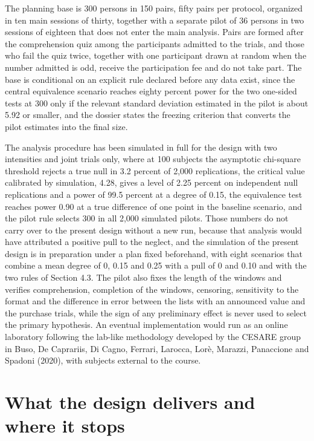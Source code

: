 \documentclass[11pt,a4paper]{article}
\begin{document}
The planning base is 300 persons in 150 pairs, fifty pairs per protocol, organized in ten main sessions of thirty, together with a separate pilot of 36 persons in two sessions of eighteen that does not enter the main analysis. Pairs are formed after the comprehension quiz among the participants admitted to the trials, and those who fail the quiz twice, together with one participant drawn at random when the number admitted is odd, receive the participation fee and do not take part. The base is conditional on an explicit rule declared before any data exist, since the central equivalence scenario reaches eighty percent power for the two one-sided tests at 300 only if the relevant standard deviation estimated in the pilot is about 5.92 or smaller, and the dossier states the freezing criterion that converts the pilot estimates into the final size.

The analysis procedure has been simulated in full for the design with two intensities and joint trials only, where at 100 subjects the asymptotic chi-square threshold rejects a true null in 3.2 percent of 2,000 replications, the critical value calibrated by simulation, 4.28, gives a level of 2.25 percent on independent null replications and a power of 99.5 percent at a degree of 0.15, the equivalence test reaches power 0.90 at a true difference of one point in the baseline scenario, and the pilot rule selects 300 in all 2,000 simulated pilots. Those numbers do not carry over to the present design without a new run, because that analysis would have attributed a positive pull to the neglect, and the simulation of the present design is in preparation under a plan fixed beforehand, with eight scenarios that combine a mean degree of 0, 0.15 and 0.25 with a pull of 0 and 0.10 and with the two rules of Section 4.3. The pilot also fixes the length of the windows and verifies comprehension, completion of the windows, censoring, sensitivity to the format and the difference in error between the lists with an announced value and the purchase trials, while the sign of any preliminary effect is never used to select the primary hypothesis. An eventual implementation would run as an online laboratory following the lab-like methodology developed by the CESARE group in Buso, De Caprariis, Di Cagno, Ferrari, Larocca, Lor\`e, Marazzi, Panaccione and Spadoni (2020), with subjects external to the course.

\section{What the design delivers and where it stops}
\end{document}

